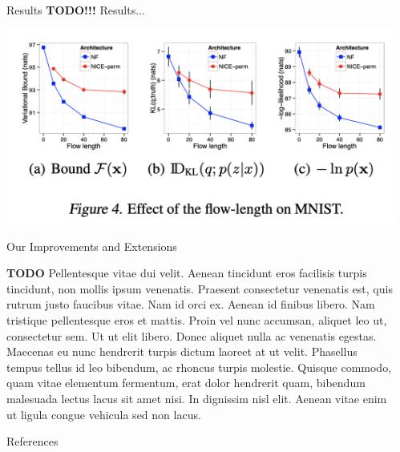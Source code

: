 \documentclass[final,hyperref={pdfpagelabels=false}]{beamer}
\newcommand{\shrink}{-15pt}
\begin{document}
\begin{frame}[t]
\begin{columns}[t]
  \begin{column}{.3\textwidth} %

    \vspace{\shrink} 
    \begin{block}{Results}
        \textbf{TODO!!!}         
      Results...
    \end{block}
    
       \begin{center}
        \includegraphics[width=0.9\columnwidth]{flowlen}
      \end{center}
    
    
    \begin{block}{Our Improvements and Extensions}
    
	\textbf{TODO} Pellentesque vitae dui velit. Aenean tincidunt eros facilisis turpis tincidunt, non mollis ipsum venenatis. Praesent consectetur venenatis est, quis rutrum justo faucibus vitae. Nam id orci ex. Aenean id finibus libero. Nam tristique pellentesque eros et mattis. Proin vel nunc accumsan, aliquet leo ut, consectetur sem. Ut ut elit libero. Donec aliquet nulla ac venenatis egestas. Maecenas eu nunc hendrerit turpis dictum laoreet at ut velit. Phasellus tempus tellus id leo bibendum, ac rhoncus turpis molestie. Quisque commodo, quam vitae elementum fermentum, erat dolor hendrerit quam, bibendum malesuada lectus lacus sit amet nisi. In dignissim nisl elit. Aenean vitae enim ut ligula congue vehicula sed non lacus.    
	
	\end{block}

    \begin{block}{References}
      \nocite{*} %
      \linespread{0.928}\selectfont
      \footnotesize{
      }
    \end{block}

  \end{column} %

  \begin{column}{.02\textwidth}\end{column} %

\end{columns} %

\end{frame} %
\end{document}
